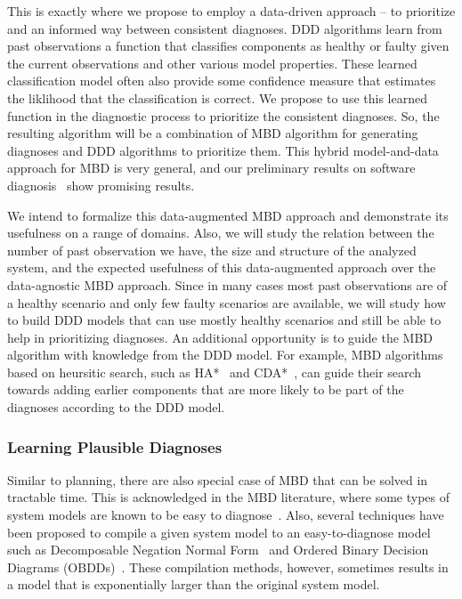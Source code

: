 \documentclass[12pt]{article}
\newcommand{\note}[1]{\textbf{\textit{#1}}}
\begin{document}
This is exactly where we propose to employ a data-driven approach -- to prioritize and an informed way between consistent diagnoses. 
DDD algorithms learn from past observations a function that classifies components as healthy or faulty given the current observations and other various model properties. These learned classification model often also provide some confidence measure that estimates the liklihood that the classification is correct. We propose to use this learned function in the diagnostic process to prioritize the consistent diagnoses. So, the resulting algorithm will be a combination of MBD algorithm for generating diagnoses and DDD algorithms to prioritize them. This hybrid model-and-data approach for MBD is very general, and our preliminary results on software diagnosis~\cite{elmishali2016data} show promising results. 

We intend to formalize this data-augmented MBD approach and demonstrate its usefulness on a range of domains. Also, we will study the relation between the number of past observation we have, the size and structure of the analyzed system, and the expected usefulness of this data-augmented approach over the data-agnostic MBD approach. Since in many cases most past observations are of a healthy scenario and only few faulty scenarios are available, we will study how to build DDD models that can use mostly healthy scenarios and still be able to help in prioritizing diagnoses. An additional opportunity is to guide the MBD algorithm with knowledge from the DDD model. For example, MBD algorithms based on heursitic search, such as HA*~\cite{feldman2006two} and CDA*~\cite{williams2007conflict}, can guide their search towards adding earlier components that are more likely to be part of the diagnoses according to the DDD model. 


\subsubsection{Learning Plausible Diagnoses} 
Similar to planning, there are also special case of MBD that can be solved in tractable time. This is acknowledged in the MBD literature, where some types of system models are known to be easy to diagnose~\cite{horn}. Also, several techniques have been proposed to compile a given system model to an easy-to-diagnose model such as Decomposable Negation Normal Form~\cite{darwiche2001decomposable} and Ordered Binary Decision Diagrams (OBDDs)~\cite{torta2006onTheUse}. These compilation methods, however, sometimes results in a model that is exponentially larger than the original system model. 
\end{document}
